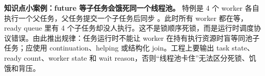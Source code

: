 \begin{casebox}
\textbf{知识点小案例：future 等子任务会饿死同一个线程池。}
特例是 4 个 worker 各自执行一个父任务，父任务提交一个子任务后同步 。此时所有 worker 都在等，ready queue 里有 4 个子任务却没人执行。这不是锁顺序死锁，而是运行时调度协议错误。由此推出规律：任务运行时不能让 worker 在持有执行资源时盲等同池子任务；应使用 continuation、helping 或结构化 join。工程上要输出 task state、ready count、worker state 和 wait reason，否则“线程池卡住”无法区分死锁、饥饿和背压。
\end{casebox}

